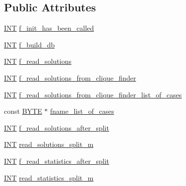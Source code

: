 \subsection*{Public Attributes}
\begin{DoxyCompactItemize}
\item 
\mbox{\hyperlink{galois_8h_a09fddde158a3a20bd2dcadb609de11dc}{I\+NT}} \mbox{\hyperlink{classisomorph__arguments_a4c8e6722002bdc6425d3a0e1416be08f}{f\+\_\+init\+\_\+has\+\_\+been\+\_\+called}}
\item 
\mbox{\hyperlink{galois_8h_a09fddde158a3a20bd2dcadb609de11dc}{I\+NT}} \mbox{\hyperlink{classisomorph__arguments_abb74f4615c75f93149e642649b17ebd8}{f\+\_\+build\+\_\+db}}
\item 
\mbox{\hyperlink{galois_8h_a09fddde158a3a20bd2dcadb609de11dc}{I\+NT}} \mbox{\hyperlink{classisomorph__arguments_a656fb3dbadbe877715b058995726cafa}{f\+\_\+read\+\_\+solutions}}
\item 
\mbox{\hyperlink{galois_8h_a09fddde158a3a20bd2dcadb609de11dc}{I\+NT}} \mbox{\hyperlink{classisomorph__arguments_af2c647fa1c3ca7755676516b0da104de}{f\+\_\+read\+\_\+solutions\+\_\+from\+\_\+clique\+\_\+finder}}
\item 
\mbox{\hyperlink{galois_8h_a09fddde158a3a20bd2dcadb609de11dc}{I\+NT}} \mbox{\hyperlink{classisomorph__arguments_ab685cd2581c9cab7d15b732a4069783b}{f\+\_\+read\+\_\+solutions\+\_\+from\+\_\+clique\+\_\+finder\+\_\+list\+\_\+of\+\_\+cases}}
\item 
const \mbox{\hyperlink{galois_8h_ab6cc7b4aeb6ea31aba2b3fbfc83ff5e6}{B\+Y\+TE}} $\ast$ \mbox{\hyperlink{classisomorph__arguments_a44171bd1e55f71e42d77592c6b9a8252}{fname\+\_\+list\+\_\+of\+\_\+cases}}
\item 
\mbox{\hyperlink{galois_8h_a09fddde158a3a20bd2dcadb609de11dc}{I\+NT}} \mbox{\hyperlink{classisomorph__arguments_a0481c1e3ee19266a7a51fae2ddfae8d9}{f\+\_\+read\+\_\+solutions\+\_\+after\+\_\+split}}
\item 
\mbox{\hyperlink{galois_8h_a09fddde158a3a20bd2dcadb609de11dc}{I\+NT}} \mbox{\hyperlink{classisomorph__arguments_acdbed49af2946cac84a521fdfc4518dd}{read\+\_\+solutions\+\_\+split\+\_\+m}}
\item 
\mbox{\hyperlink{galois_8h_a09fddde158a3a20bd2dcadb609de11dc}{I\+NT}} \mbox{\hyperlink{classisomorph__arguments_a65a746ae9b658a1d44c2fa86a046f1d4}{f\+\_\+read\+\_\+statistics\+\_\+after\+\_\+split}}
\item 
\mbox{\hyperlink{galois_8h_a09fddde158a3a20bd2dcadb609de11dc}{I\+NT}} \mbox{\hyperlink{classisomorph__arguments_a9d5765ea9185a3a0b2d889bc66abf437}{read\+\_\+statistics\+\_\+split\+\_\+m}}

\end{DoxyCompactItemize}
